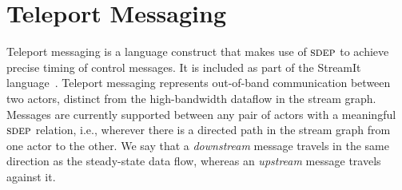 \section{Teleport Messaging}
\label{sec:teleport}


Teleport messaging is a language construct that makes use of $\textsc{sdep}$
to achieve precise timing of control messages.  It is included as part
of the StreamIt language~\cite{streamitcc}.  Teleport messaging
represents out-of-band communication between two actors, distinct from
the high-bandwidth dataflow in the stream graph.  Messages are
currently supported between any pair of actors with a meaningful
$\textsc{sdep}$ relation, i.e., wherever there is a directed path in the
stream graph from one actor to the other.  We say that a {\it
downstream} message travels in the same direction as the steady-state
data flow, whereas an {\it upstream} message travels against it.

